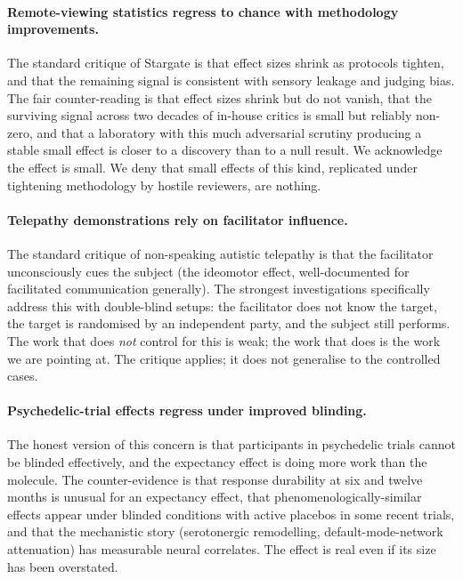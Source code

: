 \documentclass[11pt,a4paper]{article}
\begin{document}
\paragraph{Remote-viewing statistics regress to chance with
methodology improvements.} The standard critique of Stargate is
that effect sizes shrink as protocols tighten, and that the
remaining signal is consistent with sensory leakage and judging
bias. The fair counter-reading is that effect sizes shrink but do
not vanish, that the surviving signal across two decades of
in-house critics is small but reliably non-zero, and that a
laboratory with this much adversarial scrutiny producing a stable
small effect is closer to a discovery than to a null result. We
acknowledge the effect is small. We deny that small effects of this
kind, replicated under tightening methodology by hostile
reviewers, are nothing.

\paragraph{Telepathy demonstrations rely on facilitator influence.}
The standard critique of non-speaking autistic telepathy is that
the facilitator unconsciously cues the subject (the ideomotor
effect, well-documented for facilitated communication generally).
The strongest investigations specifically address this with
double-blind setups: the facilitator does not know the target, the
target is randomised by an independent party, and the subject
still performs. The work that does \emph{not} control for this is
weak; the work that does is the work we are pointing at. The
critique applies; it does not generalise to the controlled cases.

\paragraph{Psychedelic-trial effects regress under improved
blinding.} The honest version of this concern is that participants
in psychedelic trials cannot be blinded effectively, and the
expectancy effect is doing more work than the molecule. The
counter-evidence is that response durability at six and twelve
months is unusual for an expectancy effect, that
phenomenologically-similar effects appear under blinded conditions
with active placebos in some recent trials, and that the
mechanistic story (serotonergic remodelling, default-mode-network
attenuation) has measurable neural correlates. The effect is real
even if its size has been overstated.
\end{document}
